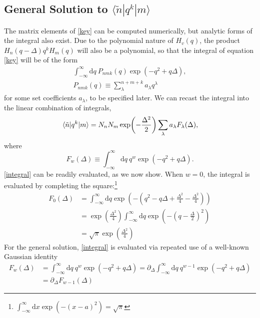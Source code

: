 \documentclass[aip, jcp, reprint, onecolumn, nofootinbib]{revtex4-2}
\begin{document}
\subsection{General Solution to $\langle \tilde{n} | q^k | m \rangle$}
The matrix elements of \autoref{key} can be computed numerically, but analytic forms of the integral also exist. 
Due to the polynomial nature of $H_v(q)$, the product $H_n(q-\Delta) q^k H_m(q)$ will also be a polynomial, so that the integral of equation \autoref{key} will be of the form
\begin{eqnarray}
	\int_{-\infty}^\infty \mathrm{d}q \ P_{nmk}(q) \exp(-q^2 + q\Delta), \\
	P_{nmk}(q) \equiv \sum_\lambda^{n+m+k} a_\lambda q^\lambda
\end{eqnarray}
for some set coefficients $a_\lambda$, to be specified later. We can recast the integral into the linear combination of integrals,
\begin{equation}\label{eq:analytic_form}
	\mel{\tilde{n}}{q^k}{m} = N_n N_m \exp(-\frac{\Delta^2}{2}) \sum_\lambda a_\lambda F_\lambda(\Delta),
\end{equation}
where
\begin{equation}\label{integral}
	F_w(\Delta) \equiv \int_{-\infty}^\infty \mathrm{d}q \ q^w \exp(-q^2 + q\Delta).
\end{equation}
\autoref{integral} can be readily evaluated, as we now show.  When $w=0$, the integral is evaluated by completing the square:\footnote{$\int_{-\infty}^{\infty} \mathrm{d}x \exp(-(x-a)^2) = \sqrt{\pi}$}
\begin{equation}
	\begin{split}
		F_0(\Delta) &= \int_{-\infty}^\infty \mathrm{d}q \exp(-(q^2 - q\Delta +\frac{\Delta^2}{4} - \frac{\Delta^2}{4}))\\
		&= \exp(\frac{\Delta^2}{4}) \int_{-\infty}^\infty \mathrm{d}q \exp(-(q - \frac{\Delta}{2})^2) \\
		&= \sqrt{\pi} \exp(\frac{\Delta^2}{4})
	\end{split}
\end{equation}
For the general solution, \autoref{integral} is evaluated via repeated use of a well-known Gaussian identity
\begin{equation}\label{identity}
	\begin{split}
		F_w(\Delta) &= \int_{-\infty}^\infty \mathrm{d}q \ q^w \exp(-q^2 + q\Delta) = \partial_{\Delta} \int_{-\infty}^\infty \mathrm{d}q \ q^{w-1} \exp(-q^2 + q\Delta) \\
		&= \partial_\Delta F_{w-1}(\Delta)
	\end{split}
\end{equation}
\end{document}
